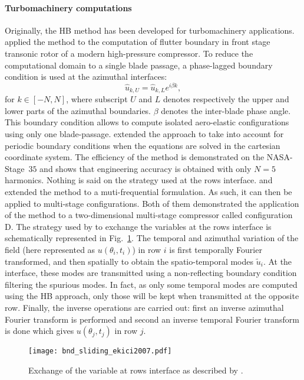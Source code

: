 \paragraph{Turbomachinery computations}
Originally, the HB method has been developed for 
turbomachinery applications.
\citet{Hall2002} applied the method to the computation
of flutter boundary in front stage transonic rotor 
of a modern high-pressure compressor. To reduce the
computational domain to a single blade passage, 
a phase-lagged boundary condition is used at the azimuthal
interfaces:
\begin{equation}
	\widehat{u}_{k, U} = \widehat{u}_{k, L} e^{i \beta k},
\end{equation}
for $k \in [-N, N]$, where subscript $U$ and $L$ denotes
respectively the upper and lower parts of the azimuthal boundaries.
$\beta$ denotes the inter-blade phase angle. This boundary
condition allows to compute isolated aero-elastic configurations
using only one blade-passage.
\citet{Weide2005} extended the approach to take into account
for periodic boundary conditions when the equations are solved in the
cartesian coordinate system. The efficiency of the
method is demonstrated on the NASA-Stage~$35$ and shows that
engineering accuracy is obtained with only $N=5$ harmonics.
Nothing is said on the strategy used at the rows interface.
\citet{Ekici2007} and \citet{Gopinath2007}
extended the method to a muti-frequential formulation. 
As such, it can then be applied to multi-stage
configurations. Both of them demonstrated the application of
the method to
a two-dimensional multi-stage compressor called
configuration D. 
The strategy used by \citet{Ekici2007} 
to exchange the variables at
the rows interface is schematically represented 
in Fig.~\ref{fig:bnd_sliding_ekici2007}.
The temporal and azimuthal variation 
of the field (here represented as $u (\theta_i, t_i)$)
in row $i$ is first temporally Fourier transformed, and then
spatially to obtain the spatio-temporal modes $\widetilde{u}_i$.
At the interface, these modes are transmitted using a non-reflecting
boundary condition filtering the spurious modes. In fact, as only some
temporal modes are computed using the HB approach, only
those will be kept when transmitted at the opposite row.
Finally, the inverse operations are carried out: first an inverse
azimuthal Fourier transform is performed and second an inverse
temporal Fourier transform is done which gives $u (\theta_j, t_j)$
in row $j$.
\begin{figure}[htbp]
  \centering
  \texttt{[image: bnd\_sliding\_ekici2007.pdf]}
  \caption{Exchange of the variable at rows interface as described by \citet{Ekici2007}.}
  \label{fig:bnd_sliding_ekici2007}
\end{figure}
